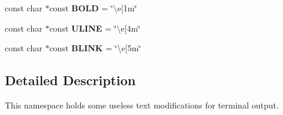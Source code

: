 \begin{DoxyCompactItemize}
const char $\ast$const {\bfseries B\+O\+LD} = \char`\"{}\textbackslash{}e\mbox{[}1m\char`\"{}
\item 
\mbox{\label{namespacetext_a7bf854af552237d9c8e3a422b9dabcc5}} 
const char $\ast$const {\bfseries U\+L\+I\+NE} = \char`\"{}\textbackslash{}e\mbox{[}4m\char`\"{}
\item 
\mbox{\label{namespacetext_a224cbea063847abbb2d57eb0eeb7e969}} 
const char $\ast$const {\bfseries B\+L\+I\+NK} = \char`\"{}\textbackslash{}e\mbox{[}5m\char`\"{}
\end{DoxyCompactItemize}


\subsection{Detailed Description}
This namespace holds some useless text modifications for terminal output. 